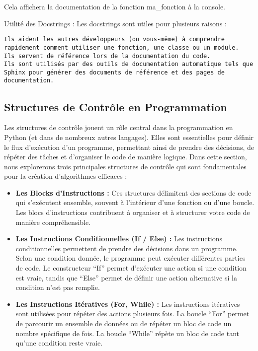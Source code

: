 \documentclass[11pt]{article}
\begin{document}
    Cela affichera la documentation de la fonction ma\_fonction à la
console.

Utilité des Docstrings : Les docstrings sont utiles pour plusieurs
raisons :

\begin{verbatim}
Ils aident les autres développeurs (ou vous-même) à comprendre rapidement comment utiliser une fonction, une classe ou un module.
Ils servent de référence lors de la documentation du code.
Ils sont utilisés par des outils de documentation automatique tels que Sphinx pour générer des documents de référence et des pages de documentation.
\end{verbatim}

    \hypertarget{structures-de-contruxf4le-en-programmation}{%
\subsection{Structures de Contrôle en
Programmation}\label{structures-de-contruxf4le-en-programmation}}

Les structures de contrôle jouent un rôle central dans la programmation
en Python (et dans de nombreux autres langages). Elles sont essentielles
pour définir le flux d'exécution d'un programme, permettant ainsi de
prendre des décisions, de répéter des tâches et d'organiser le code de
manière logique. Dans cette section, nous explorerons trois principales
structures de contrôle qui sont fondamentales pour la création
d'algorithmes efficaces :

\begin{itemize}
\item
  \textbf{Les Blocks d'Instructions :} Ces structures délimitent des
  sections de code qui s'exécutent ensemble, souvent à l'intérieur d'une
  fonction ou d'une boucle. Les blocs d'instructions contribuent à
  organiser et à structurer votre code de manière compréhensible.
\item
  \textbf{Les Instructions Conditionnelles (If / Else) :} Les
  instructions conditionnelles permettent de prendre des décisions dans
  un programme. Selon une condition donnée, le programme peut exécuter
  différentes parties de code. Le constructeur ``If'' permet d'exécuter
  une action si une condition est vraie, tandis que ``Else'' permet de
  définir une action alternative si la condition n'est pas remplie.
\item
  \textbf{Les Instructions Itératives (For, While) :} Les instructions
  itératives sont utilisées pour répéter des actions plusieurs fois. La
  boucle ``For'' permet de parcourir un ensemble de données ou de
  répéter un bloc de code un nombre spécifique de fois. La boucle
  ``While'' répète un bloc de code tant qu'une condition reste vraie.
\end{itemize}
\end{document}
